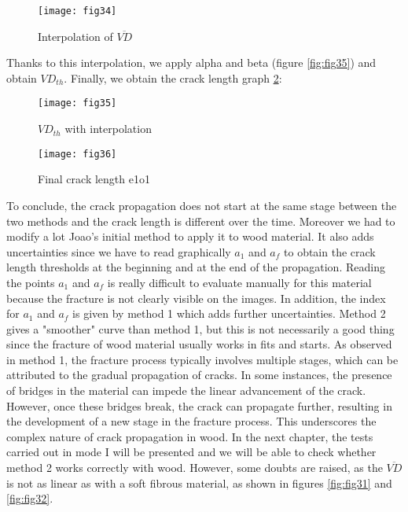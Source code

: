 \begin{figure}[htp]
	\centering
	\texttt{[image: fig34]}
	\caption{Interpolation of $\overline{VD}$}
	\label{fig:fig34}
\end{figure}

Thanks to this interpolation, we apply alpha and beta (figure \ref{fig:fig35}) and obtain $VD_{th}$. Finally, we obtain the crack length graph \ref{fig:fig36}:

\begin{figure}[h]
	\begin{minipage}[c]{.46\linewidth}
		\centering
		\texttt{[image: fig35]}
		\caption{$VD_{th}$ with interpolation}
		\label{fig:fig35}
	\end{minipage}
	\hfill%
	\begin{minipage}[c]{.46\linewidth}
		\centering
		\texttt{[image: fig36]}
		\caption{Final crack length e1o1}
		\label{fig:fig36}
	\end{minipage}
\end{figure}

To conclude, the crack propagation does not start at the same stage between the two methods and the crack length is different over the time. Moreover we had to modify a lot Joao's initial method to apply it to wood material. It also adds uncertainties since we have to read graphically $a_1$ and $a_f$ to obtain the crack length thresholds at the beginning and at the end of the propagation. Reading the points $a_1$ and $a_f$ is really difficult to evaluate manually for this material because the fracture is not clearly visible on the images. In addition, the index for $a_1$ and $a_f$ is given by method 1 which adds further uncertainties. Method 2 gives a "smoother" curve than method 1, but this is not necessarily a good thing since the fracture of wood material usually works in fits and starts.
As observed in method 1, the fracture process typically involves multiple stages, which can be attributed to the gradual propagation of cracks. In some instances, the presence of bridges in the material can impede the linear advancement of the crack. However, once these bridges break, the crack can propagate further, resulting in the development of a new stage in the fracture process. This underscores the complex nature of crack propagation in wood. In the next chapter, the tests carried out in mode I will be presented and we will be able to check whether method 2 works correctly with wood. However, some doubts are raised, as the $\overline{VD}$ is not as linear as with a soft fibrous material, as shown in figures \ref{fig:fig31} and \ref{fig:fig32}.

